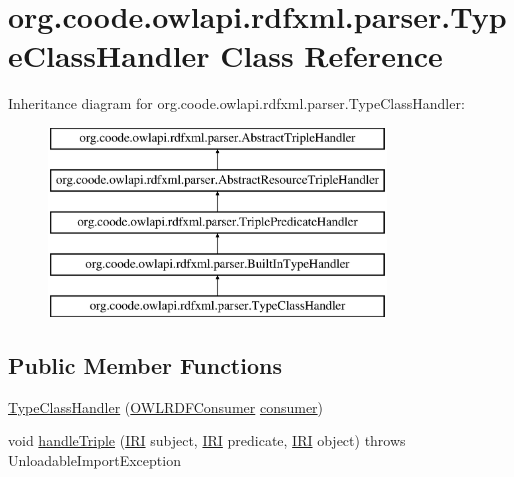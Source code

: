\hypertarget{classorg_1_1coode_1_1owlapi_1_1rdfxml_1_1parser_1_1_type_class_handler}{\section{org.\-coode.\-owlapi.\-rdfxml.\-parser.\-Type\-Class\-Handler Class Reference}
\label{classorg_1_1coode_1_1owlapi_1_1rdfxml_1_1parser_1_1_type_class_handler}
}
Inheritance diagram for org.\-coode.\-owlapi.\-rdfxml.\-parser.\-Type\-Class\-Handler\-:\begin{figure}[H]
\begin{center}
\leavevmode
\includegraphics[height=5.000000cm]{classorg_1_1coode_1_1owlapi_1_1rdfxml_1_1parser_1_1_type_class_handler}
\end{center}
\end{figure}
\subsection*{Public Member Functions}
\begin{DoxyCompactItemize}
\item 
\hyperlink{classorg_1_1coode_1_1owlapi_1_1rdfxml_1_1parser_1_1_type_class_handler_a565449f56e80c03fd4cb9f4763d9e04f}{Type\-Class\-Handler} (\hyperlink{classorg_1_1coode_1_1owlapi_1_1rdfxml_1_1parser_1_1_o_w_l_r_d_f_consumer}{O\-W\-L\-R\-D\-F\-Consumer} \hyperlink{classorg_1_1coode_1_1owlapi_1_1rdfxml_1_1parser_1_1_abstract_triple_handler_a4ccf4d898ff01eb1cadfa04b23d54e9c}{consumer})
\item 
void \hyperlink{classorg_1_1coode_1_1owlapi_1_1rdfxml_1_1parser_1_1_type_class_handler_a16407cfd790bfacc5e977cd5eb757e20}{handle\-Triple} (\hyperlink{classorg_1_1semanticweb_1_1owlapi_1_1model_1_1_i_r_i}{I\-R\-I} subject, \hyperlink{classorg_1_1semanticweb_1_1owlapi_1_1model_1_1_i_r_i}{I\-R\-I} predicate, \hyperlink{classorg_1_1semanticweb_1_1owlapi_1_1model_1_1_i_r_i}{I\-R\-I} object)  throws Unloadable\-Import\-Exception 
\end{DoxyCompactItemize}
